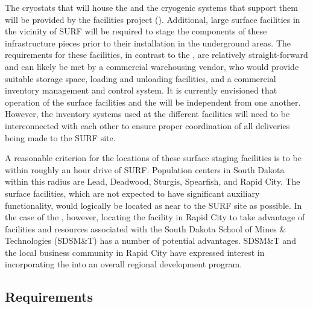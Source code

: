 The cryostats that will house the  and the cryogenic
systems that support them will be provided by the facilities project
().  Additional, large surface facilities in the vicinity
of SURF will be required to stage the components of these
infrastructure pieces prior to their installation in the underground
areas.  The requirements for these facilities, in contrast to the
, are relatively straight-forward and can likely be met by
a commercial warehousing vendor, who would provide suitable storage
space, loading and unloading facilities, and a commercial inventory
management and control system.  It is currently envisioned that
operation of the  surface facilities and the 
 will be independent from one another.  However, the
inventory systems used at the different facilities will need to be
interconnected with each other to ensure proper coordination of all
deliveries being made to the SURF site.

A reasonable criterion for the locations of these surface staging
facilities is to be within roughly an hour drive of SURF.
Population centers in South Dakota within this radius are Lead,
Deadwood, Sturgis, Spearfish, and Rapid City.  The 
surface facilities, which are not expected to have significant
auxiliary functionality, would logically be located as near to the
SURF site as possible.  In the case of the 
, however, locating the facility in Rapid City to take
advantage of facilities and resources associated with the South Dakota
School of Mines \& Technologies (SDSM\&T) has a number of potential
advantages.  SDSM\&T and the local business community in Rapid City
have expressed interest in incorporating the  
into an overall regional development program.

\subsection{Requirements}

